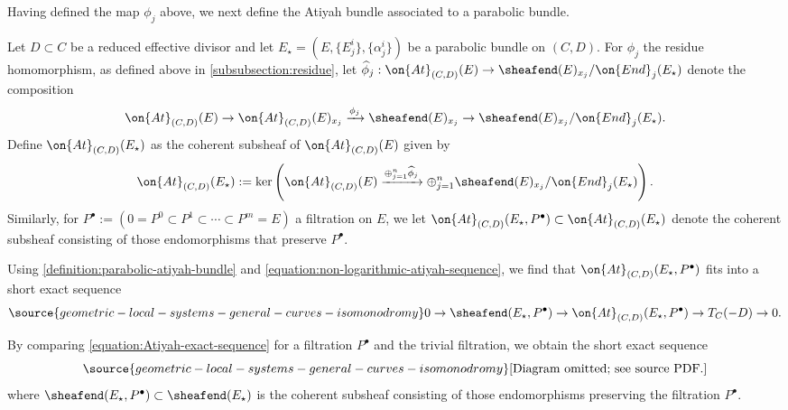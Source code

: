 Having defined the map $\phi_j$ above, we next define the Atiyah bundle
associated to a parabolic bundle.
\begin{definition}
\notready
	\label{definition:parabolic-atiyah-bundle}
Let $D\subset C$ be a reduced effective divisor
and let $E_\star = (E, \{E^i_j\}, \{\alpha^i_j\})$ be a parabolic bundle on $(C,
D)$.
For $\phi_j$ the residue homomorphism, as defined above in
\autoref{subsubsection:residue},
let $\widehat{\phi}_j: \on{At}_{(C, D)}(E) \to \sheafend(E)_{x_j}/\on{End}_j(E_\star)$ denote the composition
\begin{align*}
	\on{At}_{(C, D)}(E) \to \on{At}_{(C,D)}(E)_{x_j} \xrightarrow{\phi_j}
	\sheafend(E)_{x_j} \to \sheafend(E)_{x_j}/\on{End}_j(E_\star).
\end{align*}
Define $\on{At}_{(C, D)}(E_\star)$ as the coherent subsheaf of $\on{At}_{(C, D)}(E)$ given by
\begin{align*}
	\on{At}_{(C,D)}(E_\star) := \ker\left( \on{At}_{(C,D)}(E)
	\xrightarrow{\oplus_{j=1}^n \widehat{\phi}_j } \oplus_{j=1}^n
\sheafend(E)_{x_j}/\on{End}_j(E_\star) \right).
\end{align*}
Similarly, for $P^\bullet := (0 = P^0 \subset P^1
\subset \cdots \subset P^m = E)$ a filtration on $E$,
we let
$\on{At}_{(C,D)}(E_\star, P^\bullet) \subset \on{At}_{(C, D)}(E_\star)$
denote the coherent subsheaf
consisting of those endomorphisms that preserve $P^\bullet$.
\end{definition}

\begin{remark}
\notready
	\label{remark:}
Using \autoref{definition:parabolic-atiyah-bundle}
	and \eqref{equation:non-logarithmic-atiyah-sequence},
	we find that $\on{At}_{(C,D)}(E_\star, P^\bullet)$ fits into a short exact sequence
\begin{equation}\label{equation:Atiyah-exact-sequence}
\source{geometric-local-systems-general-curves-isomonodromy}
	0\to \sheafend(E_\star, P^\bullet)\to \on{At}_{(C,D)}(E_\star, P^\bullet)\to T_C(-D)\to
    0.
\end{equation}


By comparing \eqref{equation:Atiyah-exact-sequence} for a filtration $P^\bullet$
and the trivial filtration, we obtain
the short exact sequence
\begin{equation}
	\label{equation:quotient-atiyah-bundles}
\source{geometric-local-systems-general-curves-isomonodromy}
	\text{[Diagram omitted; see source PDF.]}\end{equation}
where $\sheafend(E_\star, P^\bullet) \subset \sheafend(E_\star)$ is the coherent subsheaf
consisting of those endomorphisms preserving the filtration $P^\bullet$.
\end{remark}

